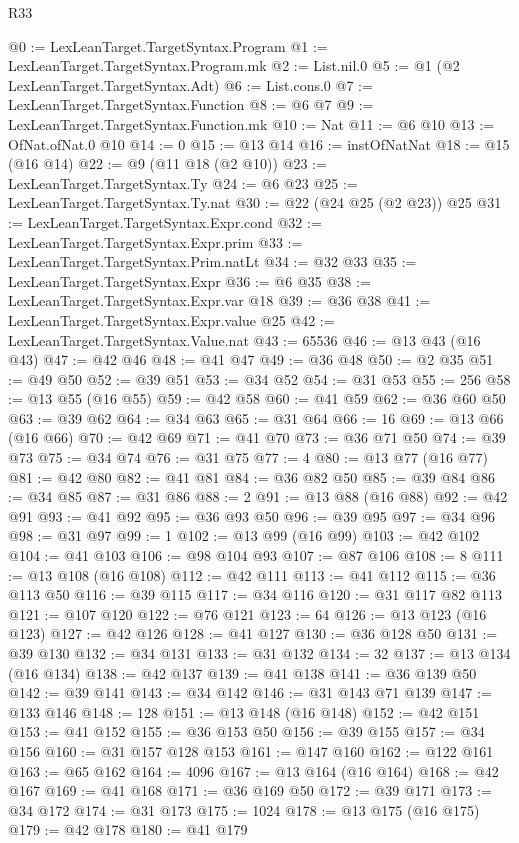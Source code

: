 \begin{lexlean}{R33}
\begin{coremodule}
@0 := LexLeanTarget.TargetSyntax.Program
@1 := LexLeanTarget.TargetSyntax.Program.mk
@2 := List.nil.{0}
@5 := @1 (@2 LexLeanTarget.TargetSyntax.Adt)
@6 := List.cons.{0}
@7 := LexLeanTarget.TargetSyntax.Function
@8 := @6 @7
@9 := LexLeanTarget.TargetSyntax.Function.mk
@10 := Nat
@11 := @6 @10
@13 := OfNat.ofNat.{0} @10
@14 := 0
@15 := @13 @14
@16 := instOfNatNat
@18 := @15 (@16 @14)
@22 := @9 (@11 @18 (@2 @10))
@23 := LexLeanTarget.TargetSyntax.Ty
@24 := @6 @23
@25 := LexLeanTarget.TargetSyntax.Ty.nat
@30 := @22 (@24 @25 (@2 @23)) @25
@31 := LexLeanTarget.TargetSyntax.Expr.cond
@32 := LexLeanTarget.TargetSyntax.Expr.prim
@33 := LexLeanTarget.TargetSyntax.Prim.natLt
@34 := @32 @33
@35 := LexLeanTarget.TargetSyntax.Expr
@36 := @6 @35
@38 := LexLeanTarget.TargetSyntax.Expr.var @18
@39 := @36 @38
@41 := LexLeanTarget.TargetSyntax.Expr.value @25
@42 := LexLeanTarget.TargetSyntax.Value.nat
@43 := 65536
@46 := @13 @43 (@16 @43)
@47 := @42 @46
@48 := @41 @47
@49 := @36 @48
@50 := @2 @35
@51 := @49 @50
@52 := @39 @51
@53 := @34 @52
@54 := @31 @53
@55 := 256
@58 := @13 @55 (@16 @55)
@59 := @42 @58
@60 := @41 @59
@62 := @36 @60 @50
@63 := @39 @62
@64 := @34 @63
@65 := @31 @64
@66 := 16
@69 := @13 @66 (@16 @66)
@70 := @42 @69
@71 := @41 @70
@73 := @36 @71 @50
@74 := @39 @73
@75 := @34 @74
@76 := @31 @75
@77 := 4
@80 := @13 @77 (@16 @77)
@81 := @42 @80
@82 := @41 @81
@84 := @36 @82 @50
@85 := @39 @84
@86 := @34 @85
@87 := @31 @86
@88 := 2
@91 := @13 @88 (@16 @88)
@92 := @42 @91
@93 := @41 @92
@95 := @36 @93 @50
@96 := @39 @95
@97 := @34 @96
@98 := @31 @97
@99 := 1
@102 := @13 @99 (@16 @99)
@103 := @42 @102
@104 := @41 @103
@106 := @98 @104 @93
@107 := @87 @106
@108 := 8
@111 := @13 @108 (@16 @108)
@112 := @42 @111
@113 := @41 @112
@115 := @36 @113 @50
@116 := @39 @115
@117 := @34 @116
@120 := @31 @117 @82 @113
@121 := @107 @120
@122 := @76 @121
@123 := 64
@126 := @13 @123 (@16 @123)
@127 := @42 @126
@128 := @41 @127
@130 := @36 @128 @50
@131 := @39 @130
@132 := @34 @131
@133 := @31 @132
@134 := 32
@137 := @13 @134 (@16 @134)
@138 := @42 @137
@139 := @41 @138
@141 := @36 @139 @50
@142 := @39 @141
@143 := @34 @142
@146 := @31 @143 @71 @139
@147 := @133 @146
@148 := 128
@151 := @13 @148 (@16 @148)
@152 := @42 @151
@153 := @41 @152
@155 := @36 @153 @50
@156 := @39 @155
@157 := @34 @156
@160 := @31 @157 @128 @153
@161 := @147 @160
@162 := @122 @161
@163 := @65 @162
@164 := 4096
@167 := @13 @164 (@16 @164)
@168 := @42 @167
@169 := @41 @168
@171 := @36 @169 @50
@172 := @39 @171
@173 := @34 @172
@174 := @31 @173
@175 := 1024
@178 := @13 @175 (@16 @175)
@179 := @42 @178
@180 := @41 @179

\end{coremodule}
\end{lexlean}

